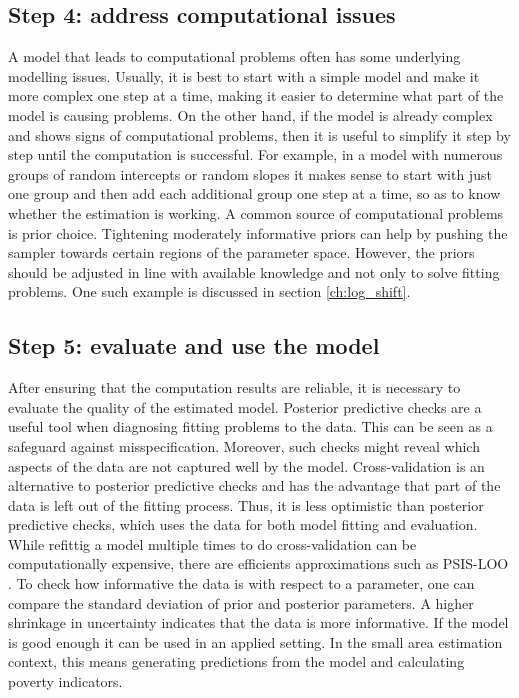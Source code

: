 
\subsection{Step 4: address computational issues}

A model that leads to computational problems often has some underlying modelling issues.
Usually, it is best to start with a simple model and make it more complex one step at a time, making it easier to determine what part of the model is causing problems.
On the other hand, if the model is already complex and shows signs of computational problems, then it is useful to simplify it step by step until the computation is successful.
For example, in a model with numerous groups of random intercepts or random slopes it makes sense to start with just one group and then add each additional group one step at a time, so as to know whether the estimation is working.
A common source of computational problems is prior choice.
Tightening moderately informative priors can help by pushing the sampler towards certain regions of the parameter space.
However, the priors should be adjusted in line with available knowledge and not only to solve fitting problems.
One such example is discussed in section \ref{ch:log_shift}.

\subsection{Step 5: evaluate and use the model}

After ensuring that the computation results are reliable, it is necessary to evaluate the quality of the estimated model.
Posterior predictive checks are a useful tool when diagnosing fitting problems to the data.
This can be seen as a safeguard against misspecification.
Moreover, such checks might reveal which aspects of the data are not captured well by the model.
Cross-validation is an alternative to posterior predictive checks and has the advantage that part of the data is left out of the fitting process.
Thus, it is less optimistic than posterior predictive checks, which uses the data for both model fitting and evaluation.
While refittig a model multiple times to do cross-validation can be computationally expensive, there are efficients approximations such as PSIS-LOO \citep{vehtari_practical_2017}.
To check how informative the data is with respect to a parameter, one can compare the standard deviation of prior and posterior parameters. A higher shrinkage in uncertainty indicates that the data is more informative.
If the model is good enough it can be used in an applied setting.
In the small area estimation context, this means generating predictions from the model and calculating poverty indicators.

